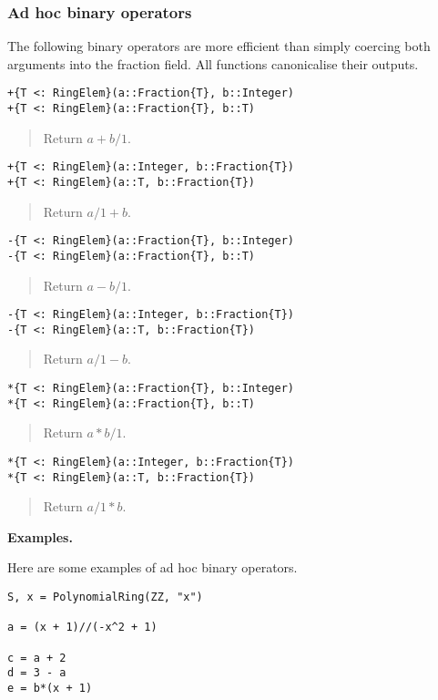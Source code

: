 \documentclass[a4paper,10pt]{article}
\newcommand{\desc}[1]{\vspace{-3mm}\begin{quote}#1\end{quote}}
\begin{document}
\subsubsection{Ad hoc binary operators}

The following binary operators are more efficient than simply coercing both
arguments into the fraction field. All functions canonicalise their outputs.

\begin{lstlisting}
+{T <: RingElem}(a::Fraction{T}, b::Integer)
+{T <: RingElem}(a::Fraction{T}, b::T)
\end{lstlisting}

\desc{Return $a + b/1$.}

\begin{lstlisting}
+{T <: RingElem}(a::Integer, b::Fraction{T})
+{T <: RingElem}(a::T, b::Fraction{T})
\end{lstlisting}

\desc{Return $a/1 + b$.}

\begin{lstlisting}
-{T <: RingElem}(a::Fraction{T}, b::Integer)
-{T <: RingElem}(a::Fraction{T}, b::T)
\end{lstlisting}

\desc{Return $a - b/1$.}

\begin{lstlisting}
-{T <: RingElem}(a::Integer, b::Fraction{T})
-{T <: RingElem}(a::T, b::Fraction{T})
\end{lstlisting}

\desc{Return $a/1 - b$.}

\begin{lstlisting}
*{T <: RingElem}(a::Fraction{T}, b::Integer)
*{T <: RingElem}(a::Fraction{T}, b::T)
\end{lstlisting}

\desc{Return $a * b/1$.}

\begin{lstlisting}
*{T <: RingElem}(a::Integer, b::Fraction{T})
*{T <: RingElem}(a::T, b::Fraction{T})
\end{lstlisting}

\desc{Return $a/1 * b$.}

\textbf{Examples.}

Here are some examples of ad hoc binary operators.

\begin{lstlisting}
S, x = PolynomialRing(ZZ, "x")

a = (x + 1)//(-x^2 + 1)

c = a + 2
d = 3 - a
e = b*(x + 1)
\end{lstlisting}
\end{document}
